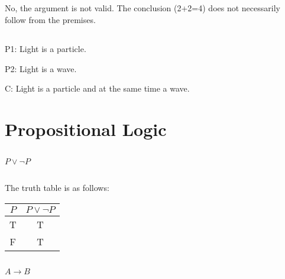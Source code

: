 \documentclass[UTF8,a4paper,AutoFakeBold,AutoFakeSlant]{article}
\begin{document}
\subsection{}

No, the argument is not valid. The conclusion (2+2=4) does not necessarily follow from the premises.


\subsection{}

P1: Light is a particle.

P2: Light is a wave.

C: Light is a particle and at the same time a wave.



\section{Propositional Logic}

\subsection{}

$ P \lor \lnot P $


\subsection{}

The truth table is as follows:
\begin{table}[H]
\centering
\begin{tabular}{|c|c|}
\hline
$P$ & $P \lor \lnot P$ \\ \hline
T   & T                \\ \hline
F   & T                \\ \hline
\end{tabular}
\end{table}


\subsection{}

\subsubsection{}
$A \rightarrow B$
\end{document}
